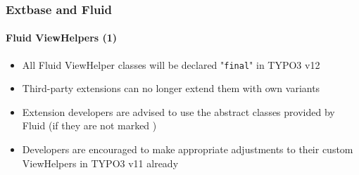 %

\begin{frame}[fragile]
	\frametitle{Extbase and Fluid}
	\framesubtitle{Fluid ViewHelpers (1)}


	\begin{itemize}
		\item All Fluid ViewHelper classes will be declared "\texttt{final}" in
			TYPO3 v12
		\item Third-party extensions can no longer extend them with own variants
		\item Extension developers are advised to use the abstract classes
			provided by Fluid (if they are not marked \texttt{\@internal})
		\item Developers are encouraged to make appropriate adjustments to their
			custom ViewHelpers in TYPO3 v11 already
	\end{itemize}

\end{frame}

